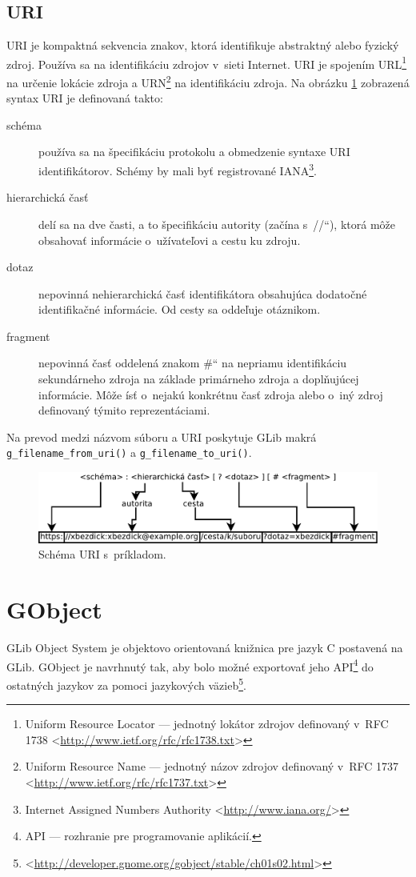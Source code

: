 \documentclass[12pt,oneside,final]{fithesis2}
\newcommand\uv[1]{\quotedblbase #1\textquotedblleft}
\begin{document}
\subsection{URI} 
URI je kompaktná sekvencia znakov, ktorá identifikuje abstraktný alebo fyzický zdroj. Používa sa na identifikáciu zdrojov v~sieti Internet. URI je spojením URL\footnote{Uniform Resource Locator --- jednotný lokátor zdrojov definovaný v~RFC 1738 <\url{http://www.ietf.org/rfc/rfc1738.txt}>} na určenie lokácie zdroja a URN\footnote{Uniform Resource Name --- jednotný názov zdrojov definovaný v~RFC 1737 <\url{http://www.ietf.org/rfc/rfc1737.txt}>} na identifikáciu zdroja. Na obrázku \ref{obr.URI} zobrazená syntax URI je definovaná takto:
\begin{description}
\item[schéma] používa sa na špecifikáciu protokolu a obmedzenie syntaxe URI identifikátorov. Schémy by mali byť registrované IANA\footnote{Internet Assigned Numbers Authority <\url{http://www.iana.org/}>}.
\item[hierarchická časť] delí sa na dve časti, a to špecifikáciu autority (začína s~\uv{//}), ktorá môže obsahovať informácie o~užívateľovi a cestu ku zdroju.
\item[dotaz] nepovinná nehierarchická časť identifikátora obsahujúca dodatočné identifikačné informácie. Od cesty sa oddeľuje otáznikom.%
\item[fragment] nepovinná časť oddelená znakom \uv{\#} na nepriamu identifikáciu sekundárneho zdroja na základe primárneho zdroja a doplňujúcej informácie. Môže ísť o~nejakú konkrétnu časť zdroja alebo o~iný zdroj definovaný týmito reprezentáciami.
\end{description}
Na prevod medzi názvom súboru a URI poskytuje GLib makrá \texttt{g\_\-filename\_\-from\_\-uri()} a \texttt{g\_\-filename\_\-to\_\-uri()}.

\begin{figure}[hbpt]
\includegraphics[width=\linewidth]{Diagram1.pdf}
\caption{Schéma URI s~príkladom.}
\label{obr.URI}
\end{figure}

\section{GObject}
GLib Object System je objektovo orientovaná knižnica pre jazyk C postavená na GLib. GObject je navrhnutý tak, aby bolo možné exportovať jeho API\footnote{API --- rozhranie pre programovanie aplikácií.} do ostatných jazykov za pomoci jazykových väzieb\footnote{<\url{http://developer.gnome.org/gobject/stable/ch01s02.html}>}.
\end{document}
